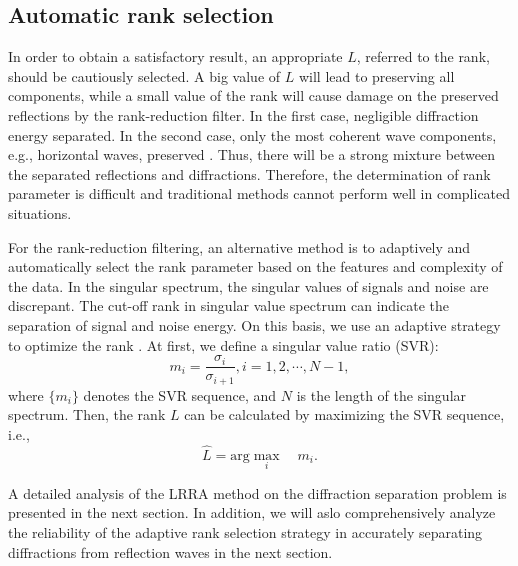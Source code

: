 \subsection{Automatic rank selection}
In order to obtain a satisfactory result, an appropriate $L$, referred to the rank, should be cautiously selected.  A big value of $L$ will lead to preserving all components, while a small value of the rank will cause damage on the preserved reflections by the rank-reduction filter.  In the first case, negligible diffraction energy  separated. In the second case, only the most coherent wave components, e.g., horizontal waves,  preserved \cite[]{yangkang2017lsrtm,yangkang2019nc}. Thus, there will be a strong mixture between the separated reflections and diffractions. Therefore, the determination of rank parameter is difficult and traditional methods  \cite[]{Vicente2011Simultaneous} cannot perform well in complicated situations. 

For the rank-reduction filtering, an alternative method is to adaptively and automatically select the rank parameter based on the features and complexity of the data. In the singular spectrum, the singular values of signals and noise are discrepant. The cut-off rank in singular value spectrum can indicate the separation of signal and noise energy. On this basis, we use an adaptive strategy to optimize the rank \cite[]{yangkang2017lsrtm,yangkang2019nc}.  At first, we define a singular value ratio (SVR):
\begin{equation} 
\label{eq:svr}
m_i=\dfrac{\sigma_i}{\sigma_{i+1}},i=1,2,\cdots,N-1,
\end{equation}
where $\{m_i\}$ denotes the SVR sequence, and $N$ is the length of the singular spectrum. Then, the rank $L$ can be calculated by maximizing the  SVR sequence, i.e.,
\begin{equation} \label{eq:svr}
\hat{L}=\text{arg} \max\limits_i\quad m_i.
\end{equation}

A detailed analysis of the LRRA method on the diffraction separation problem is presented in the next section. In addition, we will aslo comprehensively analyze the reliability of the adaptive rank selection strategy in accurately separating diffractions from reflection waves in the next section. 




